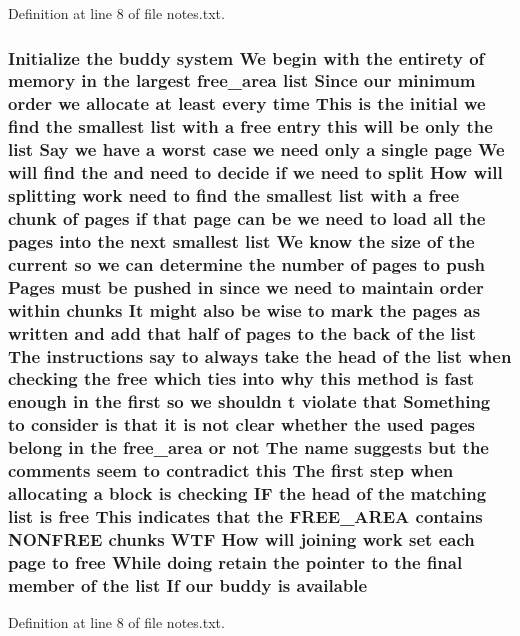Definition at line 8 of file notes.\+txt.

\subsubsection[{\texorpdfstring{available}{available}}]{\setlength{\rightskip}{0pt plus 5cm}Initialize the buddy system We begin with the entirety of memory {\bf in} the largest {\bf free\+\_\+area} {\bf list} Since our minimum {\bf order} we allocate at least every time This {\bf is} the initial we find the smallest {\bf list} with a free entry this will be only the {\bf list} Say we have a worst case we need only a single {\bf page} We will find the and need to decide if we need to {\bf split} How will splitting work need to find the smallest {\bf list} with a free {\bf chunk} of {\bf pages} if that {\bf page} can be we need to load all the {\bf pages} into the next smallest {\bf list} We know the size of the current {\bf so} we can determine the number of {\bf pages} to push Pages must be pushed {\bf in} since we need to maintain {\bf order} within chunks It might also be wise to mark the {\bf pages} as written and add that half of {\bf pages} to the back of the {\bf list} The instructions say to always take the head of the {\bf list} when checking the free which ties into why this method {\bf is} fast enough {\bf in} the {\bf first} {\bf so} we shouldn t violate that Something to consider {\bf is} that {\bf it} {\bf is} {\bf not} clear whether the used {\bf pages} belong {\bf in} the {\bf free\+\_\+area} or {\bf not} The name suggests but the comments seem to contradict this The {\bf first} step when allocating a block {\bf is} checking IF the head of the matching {\bf list} {\bf is} free This indicates that the F\+R\+E\+E\+\_\+\+A\+R\+EA contains N\+O\+N\+F\+R\+EE chunks W\+TF How will joining work set each {\bf page} to free While doing retain the pointer to the final member of the {\bf list} If our buddy {\bf is} available}\hypertarget{notes_8txt_a8c31bb9cef90c63b642e6d5cc012829d}{}\label{notes_8txt_a8c31bb9cef90c63b642e6d5cc012829d}


Definition at line 8 of file notes.\+txt.


